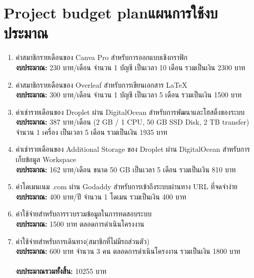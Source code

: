 \section{\ifenglish Project budget plan\else แผนการใช้งบประมาณ\fi}
\begin{enumerate}
    \item ค่าสมาชิกรายเดือนของ Canva Pro สำหรับการออกแบบเชิงกราฟิก \\
    \textbf{งบประมาณ:} 230 บาท/เดือน จำนวน 1 บัญชี เป็นเวลา 10 เดือน รวมเป็นเงิน 2300 บาท
    \item ค่าสมาชิกรายเดือนของ Overleaf สำหรับการเขียนเอกสาร \LaTeX \\
    \textbf{งบประมาณ:} 300 บาท/เดือน จำนวน 1 บัญชี เป็นเวลา 5 เดือน รวมเป็นเงิน 1500 บาท
    \item ค่าเช่ารายเดือนของ Droplet ผ่าน DigitalOcean สำหรับการพัฒนาและโฮสติ้งของระบบ\\
    \textbf{งบประมาณ:} 387 บาท/เดือน (2 GB / 1 CPU, 50 GB SSD Disk, 2 TB transfer) \\
    จำนวน 1 เครื่อง เป็นเวลา 5 เดือน รวมเป็นเงิน 1935 บาท
    \item ค่าเช่ารายเดือนของ Additional Storage ของ Droplet ผ่าน DigitalOcean สำหรับการ\\
    เก็บข้อมูล Workspace\\
    \textbf{งบประมาณ:} 162 บาท/เดือน ขนาด 50 GB เป็นเวลา 5 เดือน รวมเป็นเงิน 810 บาท
    \item ค่าโดเมนเนม .com ผ่าน Godaddy สำหรับการเข้าถึงระบบผ่านทาง URL ที่จดจำง่าย\\
    \textbf{งบประมาณ:} 400 บาท/ปี จำนวน 1 โดเมน รวมเป็นเงิน 400 บาท
    \item ค่าใช้จ่ายสำหรับการรวบรวมข้อมูลในการทดสอบระบบ\\
    \textbf{งบประมาณ:} 1500 บาท ตลอดการดำเนินโครงงาน
    \item ค่าใช้จ่ายสำหรับการเดินทาง(สมาชิกที่ไม่มีรถส่วนตัว)\\
    \textbf{งบประมาณ:} 600 บาท จำนวน 3 คน ตลอดการดำเนินโครงงาน รวมเป็นเงิน 1800 บาท\\ \\
    \textbf{งบประมาณรวมทั้งสิ้น:} 10255 บาท

\end{enumerate}